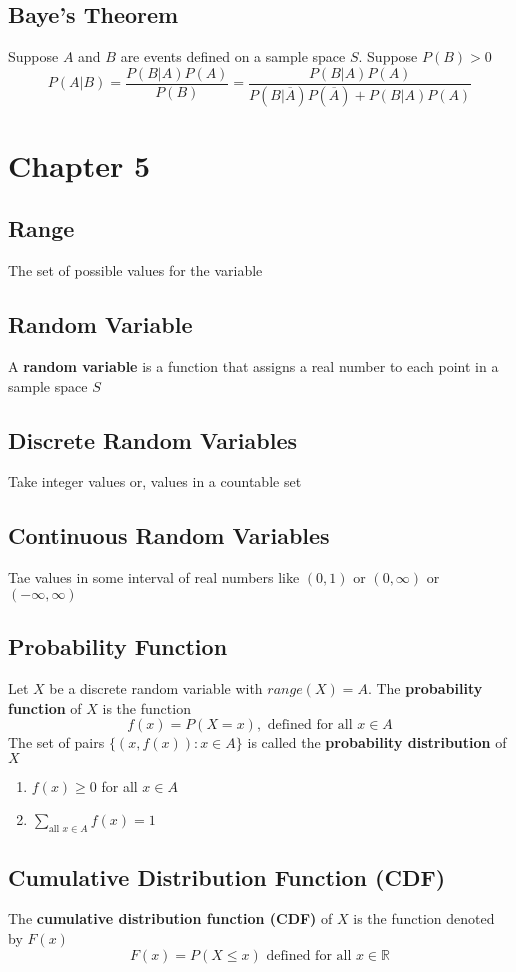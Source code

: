 \documentclass[11pt]{article}
\newcommand{\R}{{\mathbb{R}}}
\begin{document}
\subsection{Baye's Theorem}
Suppose $A$ and $B$ are events defined on a sample space $S$. Suppose $P(B)>0$
\[P(A|B) = \frac{P(B|A)P(A)}{P(B)} = \frac{P(B|A)P(A)}{P(B|\overline{A})P(\overline{A}) + P(B|A)P(A)}\]

\section{Chapter 5}
\subsection{Range}
The set of possible values for the variable
\subsection{Random Variable}
A \textbf{random variable} is a function that assigns a real number to each point in a sample space $S$
\subsection{Discrete Random Variables}
Take integer values or, values in a countable set 
\subsection{Continuous Random Variables}
Tae values in some interval of real numbers like $(0,1)$ or $(0,\infty)$ or $(-\infty, \infty)$ 
\subsection{Probability Function}
Let $X$ be a discrete random variable with $range(X) = A$. The \textbf{probability function} of $X$ is the function 
\[f(x) = P(X=x), \text{ defined for all }x\in A\]
The set of pairs $\{(x,f(x)):x\in A\}$ is called the \textbf{probability distribution} of $X$ 
\begin{enumerate}
    \item $f(x)\geq 0$ for all $x\in A$
    \item $\displaystyle\sum_{\text{all }x\in A}f(x) = 1$
\end{enumerate}
\subsection{Cumulative Distribution Function (CDF)}
The \textbf{cumulative distribution function (CDF)} of $X$ is the function denoted by $F(x)$
\[F(x) = P(X\leq x)\text{ defined for all }x\in\R\]
\end{document}
